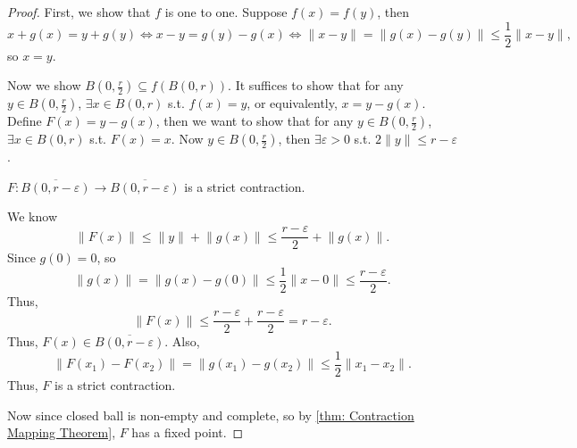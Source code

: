 \begin{proof}
    First, we show that \(f\) is one to one. Suppose \(f(x) = f(y)\), then 
    \[
        x + g(x) = y + g(y) \iff x - y = g(y) - g(x) \iff \lVert x - y \rVert = \lVert g(x) - g(y) \rVert \le \frac{1}{2} \lVert x - y \rVert,
    \]  
    so \(x = y\). 

    Now we show \(B \left( 0, \frac{r}{2} \right) \subseteq f(B(0, r)) \). It suffices to show that for any \(y \in B\left( 0, \frac{r}{2} \right) \), \(\exists x \in B(0, r)\) s.t. \(f(x) = y\), or equivalently, \(x = y - g(x)\). Define \(F(x) = y - g(x)\), then we want to show that for any \(y \in B \left( 0, \frac{r}{2} \right) \), \(\exists x \in B(0, r)\) s.t. \(F(x) = x\). Now \(y \in B\left( 0, \frac{r}{2} \right) \), then \(\exists \varepsilon > 0\) s.t. \(2 \lVert y \rVert \le r - \varepsilon\). 
    \begin{claim}
        \(F : \overline{B(0, r - \varepsilon )} \to  \overline{B(0, r - \varepsilon)}  \) is a strict contraction.
    \end{claim}
    \begin{explanation}
        We know 
        \[
            \lVert F(x) \rVert \le \lVert y \rVert + \lVert g(x) \rVert \le \frac{r - \varepsilon}{2} + \lVert g(x) \rVert.    
        \]
        Since \(g(0) = 0\), so 
        \[
            \lVert g(x) \rVert = \lVert g(x) - g(0) \rVert \le \frac{1}{2} \lVert x - 0 \rVert \le \frac{r - \varepsilon}{2}.   
        \] 
        Thus, 
        \[
            \lVert F(x) \rVert \le \frac{r - \varepsilon}{2} + \frac{r - \varepsilon}{2} = r - \varepsilon. 
        \]
        Thus, \(F(x) \in \overline{B(0, r - \varepsilon)} \). Also, 
        \[
            \lVert F(x_1) - F(x_2) \rVert = \lVert g(x_1) - g(x_2) \rVert \le \frac{1}{2} \lVert x_1 - x_2 \rVert.   
        \] 
        Thus, \(F\) is a strict contraction. 
    \end{explanation} 
    Now since closed ball is non-empty and complete, so by \autoref{thm: Contraction Mapping Theorem}, \(F\) has a fixed point. 
\end{proof}